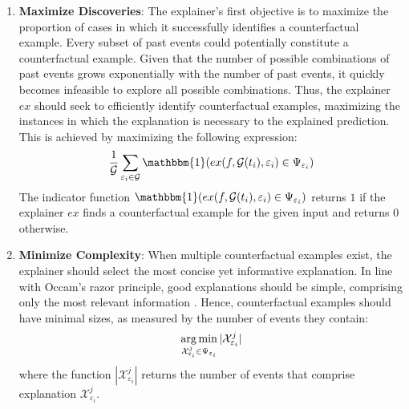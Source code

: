 \begin{enumerate}
    \item \textbf{Maximize Discoveries}: The explainer's first objective is to maximize the proportion of cases in which it successfully identifies a counterfactual example. Every subset of past events could potentially constitute a counterfactual example. Given that the number of possible combinations of past events grows exponentially with the number of past events, it quickly becomes infeasible to explore all possible combinations. Thus, the explainer $ex$ should seek to efficiently identify counterfactual examples, maximizing the instances in which the explanation is necessary to the explained prediction. This is achieved by maximizing the following expression:
    \begin{equation}
        \label{e_maxExplanationRate}
        \frac{1}{\mathcal{G}} \sum_{\varepsilon_{i} \in \mathcal{G}} \mathbbm{1}(ex(f, \mathcal{G}(t_i), \varepsilon_{i}) \in \Psi_{\varepsilon_i})
    \end{equation}
    The indicator function $\mathbbm{1}(ex(f, \mathcal{G}(t_i), \varepsilon_{i}) \in \Psi_{\varepsilon_i})$ returns $1$ if the explainer $ex$ finds a counterfactual example for the given input and returns $0$ otherwise.
    \item \textbf{Minimize Complexity}: When multiple counterfactual examples exist, the explainer should select the most concise yet informative explanation. In line with Occam's razor principle, good explanations should be simple, comprising only the most relevant information \cite{yuan_explainability_2020, tan_learning_2022}. Hence, counterfactual examples should have minimal sizes, as measured by the number of events they contain:
    \begin{equation}
        \label{e_minCFExampleSize}
        \operatorname*{arg\,min}_{\mathcal{X}_{\varepsilon_i}^j \in \Psi_{\varepsilon_i}} |\mathcal{X}_{\varepsilon_i}^j|
    \end{equation}
    where the function $|\mathcal{X}_{\varepsilon_i}^j|$ returns the number of events that comprise explanation $\mathcal{X}_{\varepsilon_i}^j$.
\end{enumerate}





